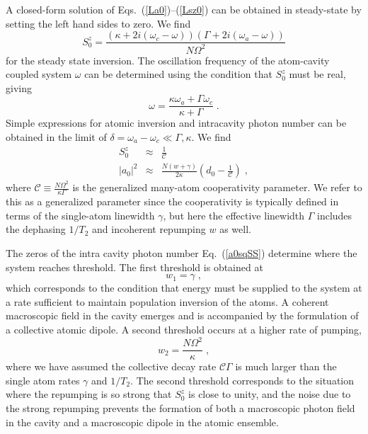 \documentclass[aps,
twocolumn,
showpacs,
superscriptaddress,groupedaddress]{revtex4}
\begin{document}
A closed-form solution of Eqs.~(\ref{La0})--(\ref{Lsz0}) can be
obtained in steady-state by setting the left hand sides to zero.  We
find
\begin{equation}
S_0^{z}=
\frac{(\kappa+2i(\omega_c-\omega))(\Gamma+2i(\omega_a-\omega))}{N\Omega^2}
\label{Sz01}
\end{equation}
for the steady state inversion. The oscillation frequency of the
atom-cavity coupled system $\omega$ can be determined using the condition
that $S_0^{z}$ must be real, giving
\begin{equation}
\omega = \frac{\kappa \omega_a + \Gamma \omega_c}{\kappa+\Gamma}\;.
\label{atomcavityfrequencycenter1}
\end{equation}
Simple expressions for atomic inversion and intracavity photon number
can be obtained in the limit of
$\delta = \omega_a-\omega_c \ll \Gamma,\kappa$. We find
\begin{eqnarray}
  S_0^{z}&\approx& \frac{1}{\mathcal{C}}\nonumber\\
  |a_0|^2&\approx&\frac{N(w+\gamma)}{2 \kappa}
             \left(d_0 - \frac{1}{\mathcal{C}}\right)\;,
\label{a0sqSS}
\end{eqnarray}
where $\mathcal{C}\equiv \frac{N \Omega^2}{\kappa \Gamma}$ is the
generalized many-atom cooperativity parameter.  We refer to this as a
generalized parameter since the cooperativity is typically defined in
terms of the single-atom linewidth $\gamma$, but here the effective
linewidth $\Gamma$ includes the dephasing $1/T_2$ and incoherent
repumping $w$ as well.


The zeros of the intra cavity photon number Eq.~(\ref{a0sqSS}) determine
where the system reaches threshold.  The first threshold is obtained at
\begin{equation}
w_1 = \gamma\;,
\label{FirstThreshold}
\end{equation}
which corresponds to the condition that energy must be supplied to the
system at a rate sufficient to maintain population inversion of the
atoms.  A coherent macroscopic field in the cavity emerges and is
accompanied by the formulation of a collective atomic dipole.  A second
threshold occurs at a higher rate of pumping,
\begin{equation}
w_2 =  \frac{N \Omega^2}{\kappa}\;,
\end{equation} 
where we have assumed the collective decay rate $\mathcal{C}\Gamma$ is
much larger than the single atom rates $\gamma$ and $1/T_2$.  The second
threshold corresponds to the situation where the repumping is so strong
that $S_0^{z}$ is close to unity, and the noise due to the strong
repumping prevents the formation of both a macroscopic photon field in
the cavity and a macroscopic dipole in the atomic ensemble.
\end{document}
